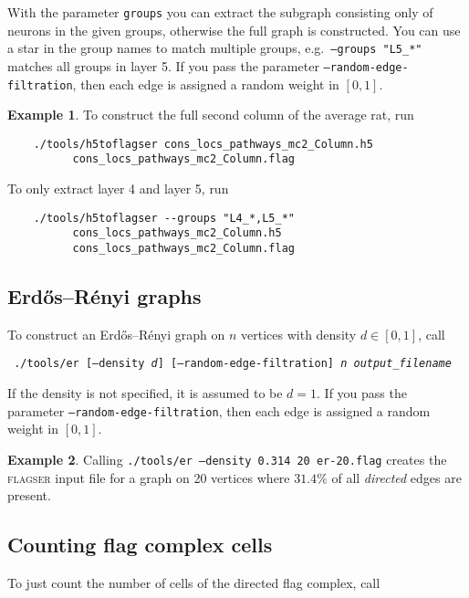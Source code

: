 \documentclass{amsart}
\theoremstyle{definition}
\newtheorem*{example*}{Example}
\begin{document}
With the parameter \texttt{groups} you can extract the subgraph consisting only of neurons in the
given groups, otherwise the full graph is constructed. You can use a star in the group names to
match multiple groups, e.g.\ \texttt{--groups "L5\_*"} matches all groups in layer 5.
If you pass the parameter \texttt{--random-edge-filtration}, then each edge is assigned a random
weight in $[0,1]$.

\begin{example*}
  To construct the full second column of the average rat, run

  \begin{verbatim}
    ./tools/h5toflagser cons_locs_pathways_mc2_Column.h5
          cons_locs_pathways_mc2_Column.flag
  \end{verbatim}

  To only extract layer 4 and layer 5, run

  \begin{verbatim}
    ./tools/h5toflagser --groups "L4_*,L5_*"
          cons_locs_pathways_mc2_Column.h5
          cons_locs_pathways_mc2_Column.flag
  \end{verbatim}
\end{example*}

\subsection{Erdős–Rényi graphs}
To construct an Erdős–Rényi graph on $n$ vertices with density $d\in[0,1]$, call

\noindent
\verb| |\qquad\texttt{./tools/er
[--density \textit{d}] [--random-edge-filtration] \textit{n} \textit{output\_filename}}

\noindent
If the density is not specified, it is assumed to be $d=1$.
If you pass the parameter \texttt{--random-edge-filtration}, then each edge is assigned a random
weight in $[0,1]$.

\begin{example*}
  Calling \texttt{./tools/er --density 0.314 20 er-20.flag} creates the \textsc{flagser} input file
  for a graph on 20 vertices where $31.4\%$ of all \emph{directed} edges are present.
\end{example*}

\subsection{Counting flag complex cells}
To just count the number of cells of the directed flag complex, call
\end{document}
